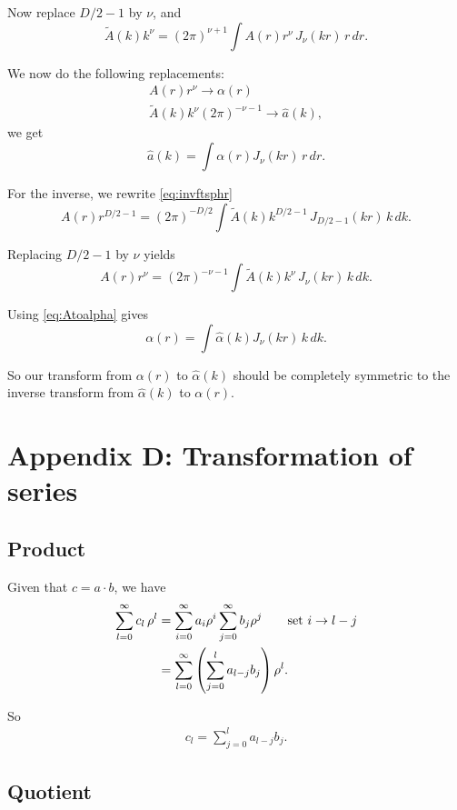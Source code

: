 \documentclass[aip,jcp,reprint,superscriptaddress]{revtex4-1}
\numberwithin{equation}{subsection}
\begin{document}
Now replace $D/2 - 1$ by $\nu$, and
\[
\tilde{A}(k) k^\nu
= (2 \pi)^{\nu+1}
\int A(r) r^\nu \, J_{\nu}(kr) \, r \, dr.
\]

We now do the following replacements:
\begin{equation}
\begin{split}
  A(r) r^\nu \rightarrow \alpha(r) \\
  \tilde{A}(k) k^\nu (2\pi)^{-\nu-1}
  \rightarrow
  \hat a(k),
\end{split}
\label{eq:Atoalpha}
\end{equation}
we get
\[
\hat a(k)
=
\int \alpha(r) J_\nu(kr) \, r \, dr.
\]

For the inverse, we rewrite \eqref{eq:invftsphr}
\[
A(r) r^{D/2-1}
=
(2\pi)^{-D/2}
\int \tilde{A}(k) k^{D/2-1} \, J_{D/2-1}(kr) \, k \, dk.
\]

Replacing $D/2 - 1$ by $\nu$ yields
\[
A(r) r^\nu
=
(2\pi)^{-\nu-1}
\int \tilde{A}(k) k^\nu \, J_\nu(kr) \, k \, dk.
\]

Using \eqref{eq:Atoalpha} gives
\[
\alpha(r)
=
\int \hat \alpha(k) J_\nu(kr) \, k \, dk.
\]

So our transform from $\alpha(r)$ to $\hat\alpha(k)$
should be completely symmetric to the inverse transform
from $\hat\alpha(k)$ to $\alpha(r)$.




\section{Appendix D: Transformation of series}

\subsection{Product}

Given that $c = a \cdot b$, we have
\begin{align*}
  \sum_{l = 0}^{\infty} c_l \, \rho^l
  &=
  \sum_{i = 0}^{\infty} a_i \rho^i
  \sum_{j = 0}^{\infty} b_j \rho^j
  \qquad \mbox{set $i \rightarrow l - j$}
 \notag \\
  &=
  \sum_{l = 0}^{\infty}
  \left(
  \sum_{j = 0}^{l}
    a_{l-j} b_j \right) \rho^l.
\end{align*}

So
\begin{align}
  c_l = \sum_{j = 0}^{l} a_{l-j} b_j.
  \label{eq:product}
\end{align}



\subsection{Quotient}
\end{document}
